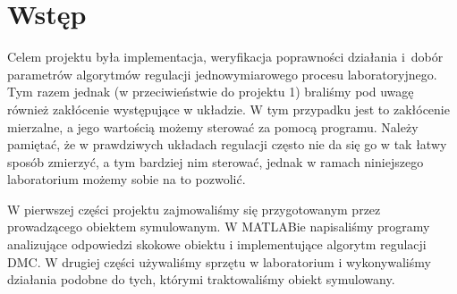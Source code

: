 \chapter{Wstęp}

Celem projektu była implementacja, weryfikacja poprawności działania i~dobór parametrów algorytmów regulacji jednowymiarowego procesu laboratoryjnego. Tym razem jednak (w przeciwieństwie do projektu 1) braliśmy pod uwagę również zakłócenie występujące w układzie. W tym przypadku jest to zakłócenie mierzalne, a jego wartością możemy sterować za pomocą programu. Należy pamiętać, że w prawdziwych układach regulacji często nie da się go w tak łatwy sposób zmierzyć, a tym bardziej nim sterować, jednak w ramach niniejszego laboratorium możemy sobie na to pozwolić.

W pierwszej części projektu zajmowaliśmy się przygotowanym przez prowadzącego obiektem symulowanym. W MATLABie napisaliśmy programy analizujące odpowiedzi skokowe obiektu i implementujące algorytm regulacji DMC. W drugiej części używaliśmy sprzętu w laboratorium i wykonywaliśmy działania podobne do tych, którymi traktowaliśmy obiekt symulowany.